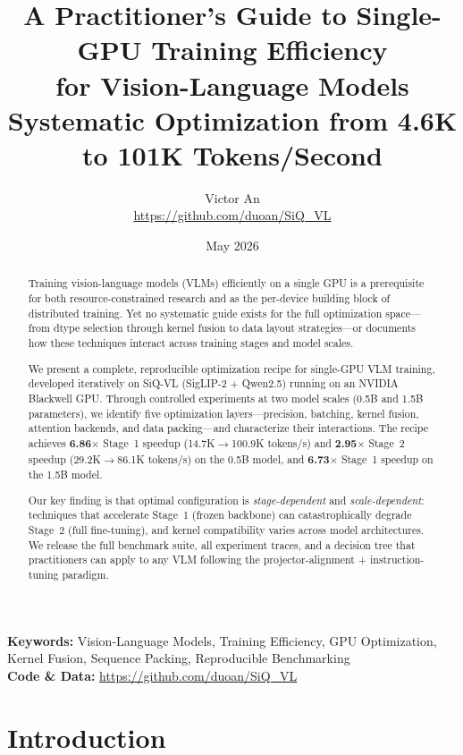 \documentclass[11pt,a4paper]{article}
\title{%
  \textbf{A Practitioner's Guide to Single-GPU Training Efficiency\\
  for Vision-Language Models}\\[6pt]
  \large Systematic Optimization from 4.6K to 101K Tokens/Second
}
\author{
  Victor An \\
  \url{https://github.com/duoan/SiQ_VL}
}
\date{May 2026}
\begin{document}
\maketitle

\begin{abstract}
Training vision-language models (VLMs) efficiently on a single GPU is a prerequisite
for both resource-constrained research and as the per-device building block of distributed
training. Yet no systematic guide exists for the full optimization space---from dtype
selection through kernel fusion to data layout strategies---or documents how these
techniques interact across training stages and model scales.

We present a complete, reproducible optimization recipe for single-GPU VLM training,
developed iteratively on SiQ-VL (SigLIP-2 + Qwen2.5) running on an NVIDIA Blackwell GPU.
Through controlled experiments at two model scales (0.5B and 1.5B parameters), we identify
five optimization layers---precision, batching, kernel fusion, attention backends, and data
packing---and characterize their interactions. The recipe achieves \textbf{6.86$\times$}
Stage~1 speedup (14.7K$\to$100.9K tokens/s) and \textbf{2.95$\times$} Stage~2 speedup
(29.2K$\to$86.1K tokens/s) on the 0.5B model, and \textbf{6.73$\times$} Stage~1 speedup
on the 1.5B model.

Our key finding is that optimal configuration is \emph{stage-dependent} and
\emph{scale-dependent}: techniques that accelerate Stage~1 (frozen backbone) can
catastrophically degrade Stage~2 (full fine-tuning), and kernel compatibility varies
across model architectures. We release the full benchmark suite, all experiment traces,
and a decision tree that practitioners can apply to any VLM following the
projector-alignment + instruction-tuning paradigm.
\end{abstract}

\vspace{0.5em}
\noindent\textbf{Keywords:} Vision-Language Models, Training Efficiency, GPU Optimization,
Kernel Fusion, Sequence Packing, Reproducible Benchmarking\\[3pt]
\noindent\textbf{Code \& Data:} \url{https://github.com/duoan/SiQ_VL}

\tableofcontents
\newpage

\section{Introduction}
\label{sec:intro}
\end{document}
